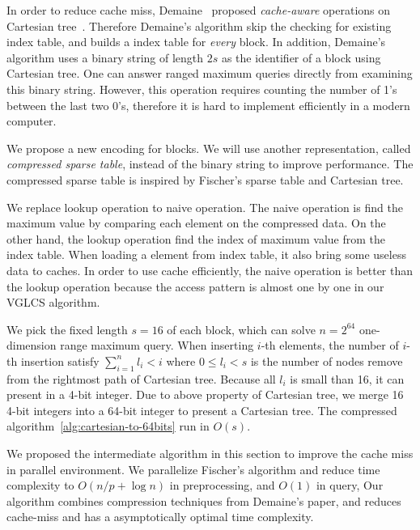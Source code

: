 
In order to reduce cache miss, Demaine~\cite{Demaine2009OnCT} proposed
{\em cache-aware} operations on Cartesian
tree~\cite{Vuillemin1980AUL}.  Therefore Demaine's algorithm skip the
checking for existing index table, and builds a index table for {\em
  every} block.  In addition, Demaine's algorithm uses a binary string
of length $2s$ as the identifier of a block using Cartesian tree.  One
can answer ranged maximum queries directly from examining this binary
string.  However, this operation requires counting the number of 1's
between the last two 0's, therefore it is hard to implement
efficiently in a modern computer.

We propose a new encoding for blocks.  We will use another
representation, called {\em compressed sparse table}, instead of the
binary string to improve performance.  The compressed sparse table is
inspired by Fischer's sparse table and Cartesian tree.

We replace lookup operation to naive operation.  The naive operation is
find the maximum value by comparing each element on the compressed data.
On the other hand, the lookup operation find the index of maximum value
from the index table. When loading a element from index table, it also
bring some useless data to caches.   In order to use cache efficiently,
the naive operation is better than the lookup operation because the
access pattern is almost one by one in our VGLCS algorithm.

We pick the fixed length $s = 16$ of each block, which can solve $n =
2^{64}$ one-dimension range maximum query.  When inserting $i$-th
elements, the number of $i$-th insertion satisfy $\sum_{i=1}^{n} l_i <
i$ where $0 \le l_i < s$ is the number of nodes remove from the
rightmost path of Cartesian tree.  Because all $l_i$ is small than 16,
it can present in a 4-bit integer.  Due to above property of Cartesian
tree, we merge 16 4-bit integers into a 64-bit integer to present a
Cartesian tree. The compressed algorithm~\ref{alg:cartesian-to-64bits}
run in $O(s)$.


We proposed the intermediate algorithm in this section to improve the
cache miss in parallel environment.  We parallelize Fischer's
algorithm and reduce time complexity to $O(n / p + \log n)$ in
preprocessing, and $O(1)$ in query, Our algorithm combines compression
techniques from Demaine's paper, and reduces cache-miss and has a
asymptotically optimal time complexity.

